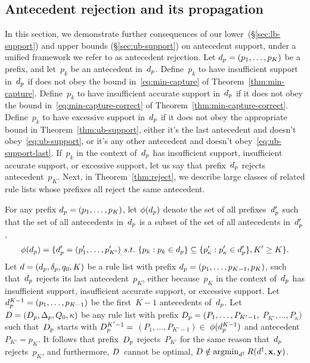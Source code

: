 \begin{arxiv}
\subsection{Antecedent rejection and its propagation}
\label{sec:reject}

In this section, we demonstrate further consequences of
our lower~(\S\ref{sec:lb-support}) and upper
bounds (\S\ref{sec:ub-support}) on antecedent support,
under a unified framework we refer to as antecedent rejection.
%
Let ${d_p = (p_1, \dots, p_K)}$ be a prefix,
and let~$p_k$ be an antecedent in~$d_p$.
%
Define~$p_k$ to have insufficient support in~$d_p$
if does not obey the bound in~\eqref{eq:min-capture}
of Theorem~\ref{thm:min-capture}.
%
Define~$p_k$ to have insufficient accurate support in~$d_p$
if it does not obey the bound in~\eqref{eq:min-capture-correct}
of Theorem~\ref{thm:min-capture-correct}.
%
Define~$p_k$ to have excessive support in~$d_p$ if it
does not obey the appropriate bound in Theorem~\ref{thm:ub-support},
\ie either it's the last antecedent and doesn't obey~\eqref{eq:ub-support},
or it's any other antecedent and doesn't obey~\eqref{eq:ub-support-last}.
%
If~$p_k$ in the context of~$d_p$ has insufficient support,
insufficient accurate support, or excessive support,
let us say that prefix~$d_p$ rejects antecedent~$p_K$.
%
Next, in Theorem~\ref{thm:reject}, we describe large classes of
related rule lists whose prefixes all reject the same antecedent.

\begin{theorem}
\label{thm:reject}
For any prefix ${d_p = (p_1, \dots, p_K)}$,
let $\phi(d_p)$ denote the set of all
prefixes~$d_p'$ such that
the set of all antecedents in~$d_p$ is a subset of
the set of all antecedents in~$d_p'$, \ie
\begin{align}
\phi(d_p) =
\{d_p' = (p'_1, \dots, p'_{K'})
~s.t.~ \{p_k : p_k \in d_p \} \subseteq
\{p'_\kappa : p'_\kappa \in d_p'\}, K' \ge K \}.
\label{eq:start-contains}
\end{align}
%
Let ${{d} = (d_p, \delta_p, q_0, K)}$ be a rule list
with prefix ${d_p = (p_1, \dots, p_{K-1}, p_{K})}$,
such that~$d_p$ rejects its last antecedent~$p_{K}$,
either because~$p_{K}$ in the context of~$d_p$ has
insufficient support, insufficient accurate support,
or excessive support.
%
Let ${d_p^{K-1} = (p_1, \dots, p_{K-1})}$ be the
first~${K - 1}$ antecedents of~$d_p$.
%
Let ${{D} = (D_p, \Delta_p, Q_0, \kappa)}$
be any rule list with prefix
${D_p = (P_1, \dots, P_{K'-1},}$ ${P_{K'}, \dots, P_{\kappa})}$
such that~$D_p$ starts with ${D_p^{K'-1} =}$
${(P_1, \dots, P_{K'-1}) \in}$ ${\phi(d_p^{K-1})}$
and antecedent ${P_{K'} = p_{K}}$.
%
It follows that prefix~$D_p$ rejects~$P_{K'}$
for the same reason that~$d_p$ rejects~$p_{K}$,
and furthermore, ${D}$~cannot be optimal, \ie
${{D} \notin \operatorname*{argmin}_{{d}^\dagger} R({d}^\dagger, \mathbf{x}, \mathbf{y})}$.
\end{theorem}


\end{arxiv}
